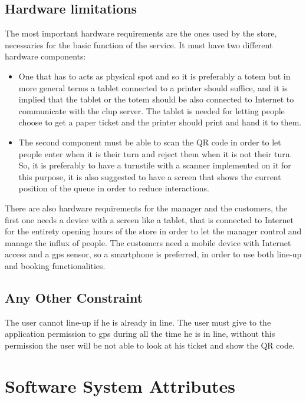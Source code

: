\subsection{Hardware limitations}

The most important hardware requirements are the ones used by the store, necessaries for the basic function of the service. It must have two different hardware components:
\begin{itemize}
	\item One that has to acts as physical spot and so it is preferably a totem but in more general terms a tablet connected to a printer should suffice, and it is implied that the tablet or the totem should be also connected to Internet to communicate with the \gls{clup} server. The tablet is needed for letting people choose to get a paper ticket and the printer should print and hand it to them.

	\item The second component must be able to scan the QR code in order to let people enter when it is their turn and reject them when it is not their turn. So, it is preferably to have a turnstile with a scanner implemented on it for this purpose, it is also suggested to have a screen that shows the current position of the queue in order to reduce interactions.

\end{itemize}

There are also hardware requirements for the manager and the customers, the first one needs a device with a screen like a tablet, that is connected to Internet for the entirety opening hours of the store in order to let the manager control and manage the influx of people. The customers need a mobile device with Internet access and a \gls{gps} sensor, so a smartphone is preferred, in order to use both line-up and booking functionalities. 

\subsection{Any Other Constraint}

The user cannot line-up if he is already in line.
The user must give to the application permission to \gls{gps} during all the time he is in line, without this permission the user will be not able to look at his ticket and show the QR code.


\section{Software System Attributes}

